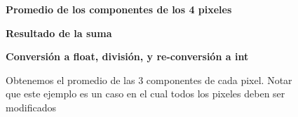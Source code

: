 \begin{itemize}
        \begin{figure}[!ht]
              \centering
              \par      
              \textbf{Promedio de los componentes de los 4 pixeles}
              \bigskip
              \par  
            
              
              \bigskip          
            \textbf{Resultado de la suma}
              \textbf{Conversión a float, división, y re-conversión a int}
              \par      
              \bigskip
              \caption{Obtenemos el promedio de las 3 componentes de cada pixel. Notar que este ejemplo es un caso en el cual todos los pixeles deben ser modificados} 
        \end{figure}
        

\end{itemize}
